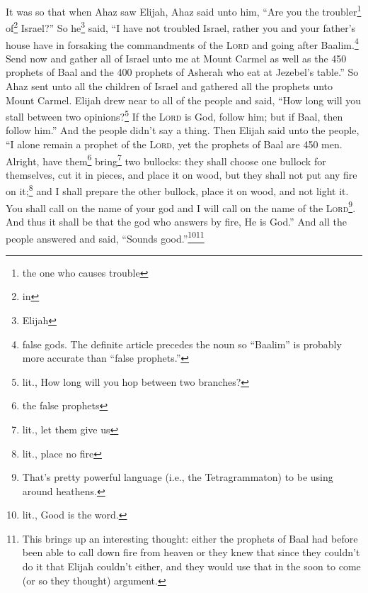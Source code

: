 
\begin{enumerate*}[mode=unboxed]
     It was so that when Ahaz saw Elijah, Ahaz said unto him, ``Are you the troubler\footnote{the one who causes trouble} of\footnote{in} Israel?''%
     So he\footnote{Elijah} said, ``I have not troubled Israel, rather you and your father's house have in forsaking the commandments of the \textsc{Lord} and going after Baalim.\footnote{false gods. The definite article precedes the noun so ``Baalim'' is probably more accurate than ``false prophets.''}%
     Send now and gather all of Israel unto me at Mount Carmel as well as the 450 prophets of Baal and the 400 prophets of Asherah who eat at Jezebel's table.''%
     So Ahaz sent unto all the children of Israel and gathered all the prophets unto Mount Carmel.%
     Elijah drew near to all of the people and said, ``How long will you stall between two opinions?\footnote{lit., How long will you hop between two branches?} If the \textsc{Lord} is God, follow him; but if Baal, then follow him.'' And the people didn't say a thing.%
     Then Elijah said unto the people, ``I alone remain a prophet of the \textsc{Lord}, yet the prophets of Baal are 450 men.%
     Alright, have them\footnote{the false prophets} bring\footnote{lit., let them give us} two bullocks: they shall choose one bullock for themselves, cut it in pieces, and place it on wood, but they shall not put any fire on it;\footnote{lit., place no fire} and I shall prepare the other bullock, place it on wood, and not light it.%
     You shall call on the name of your god and I will call on the name of the \textsc{Lord}\footnote{That's pretty powerful language (i.e., the Tetragrammaton) to be using around heathens.}. And thus it shall be that the god who answers by fire, He is God.'' And all the people answered and said, ``Sounds good.''\footnote{lit., Good is the word.}\footnote{This brings up an interesting thought: either the prophets of Baal had before been able to call down fire from heaven or they knew that since they couldn't do it that Elijah couldn't either, and they would use that in the soon to come (or so they thought) argument.}%

\end{enumerate*}
